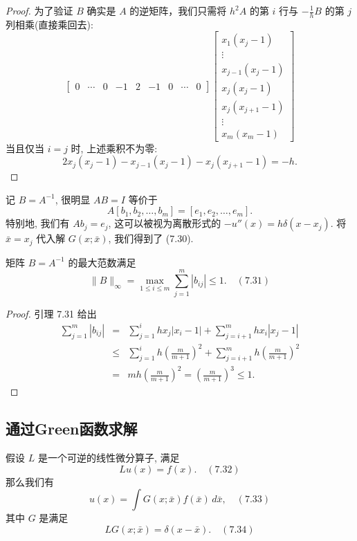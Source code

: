 \documentclass[a4paper]{ctexart}
\newcommand{\hl}[1]
{\noindent {\bf {#1}}}
\begin{document}
{\begin{proof}
为了验证 $B$ 确实是 $A$ 的逆矩阵，我们只需将 $h^2 A$ 的第 $i$ 行与 $-\frac{1}{h} B$ 
的第 $j$ 列相乘(直接乘回去): 
$$
\begin{bmatrix}
0 & \cdots & 0 & -1 & 2 & -1 & 0 & \cdots & 0
\end{bmatrix}
\begin{bmatrix}
x_1(x_j - 1) \\
\vdots \\
x_{j-1}(x_j - 1) \\
x_j(x_j - 1) \\
x_j(x_{j+1} - 1) \\
\vdots \\
x_m(x_m - 1)
\end{bmatrix}
$$
当且仅当 $i = j$ 时, 上述乘积不为零:
$$
2x_j(x_j - 1) - x_{j-1}(x_j - 1) - x_j(x_{j+1} - 1) = -h.
$$
\end{proof}

记 $B = A^{-1}$, 很明显 $AB = I$ 等价于 
$$
A[b_1, b_2, \ldots, b_m] = [e_1, e_2, \ldots, e_m].
$$
特别地, 我们有 $Ab_j = e_j$, 这可以被视为离散形式的 $-u''(x) = h\delta(x - x_j)$. 
将 $\bar{x} = x_j$ 代入解 $G(x; \bar{x})$, 我们得到了 (7.30).

\hl{定理 7.32} 矩阵 $B = A^{-1}$ 的最大范数满足
$$
\|B\|_{\infty} 
= \max_{1 \leq i \leq m} \sum_{j = 1}^{m} |b_{ij}| \leq 1. \quad (7.31)
$$

\begin{proof}
引理 7.31 给出
\begin{eqnarray*}
\sum_{j = 1}^{m} |b_{ij}| 
&=& \sum_{j = 1}^{i} h x_j |x_i - 1| 
+ \sum_{j=i+1}^{m} h x_i |x_j - 1| \\
&\leq& \sum_{j = 1}^{i} h 
\left(\frac{m}{m+1}\right)^2 
+ \sum_{j = i + 1}^{m} h 
\left(\frac{m}{m+1}\right)^2 \\
&=& mh \left(\frac{m}{m + 1}\right)^2 
= \left(\frac{m}{m+1}\right)^3 \leq 1.
\end{eqnarray*}   
\end{proof}

\subsection{通过Green函数求解}

\hl{引理 7.33} 假设 $L$ 是一个可逆的线性微分算子, 满足
$$
L u(x) = f(x). \quad (7.32)
$$
那么我们有
$$
u(x) = \int G(x; \bar{x})f(\bar{x}) \, d\bar{x}, \quad (7.33)
$$
其中 $G$ 是满足
$$
LG(x; \bar{x}) = \delta(x - \bar{x}). \quad (7.34)
$$

}
\end{document}
